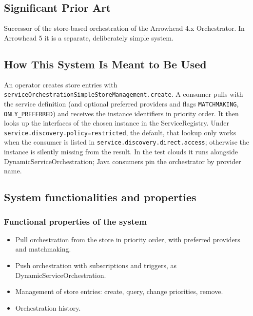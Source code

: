 \documentclass[a4paper]{arrowhead}
\begin{document}
\newpage

\subsection{Significant Prior Art}
\label{sec:prior_art}

Successor of the store-based orchestration of the Arrowhead 4.x Orchestrator. In Arrowhead 5 it is a separate, deliberately simple system.

\subsection{How This System Is Meant to Be Used}
\label{sec:use}

An operator creates store entries with \texttt{service\allowbreak{}Orchestration\allowbreak{}Simple\allowbreak{}Store\allowbreak{}Management.\allowbreak{}create}. A consumer pulls with the service definition (and optional preferred providers and flags \texttt{MATCHMAKING}, \texttt{ONLY\_\allowbreak{}PREFERRED}) and receives the instance identifiers in priority order. It then looks up the interfaces of the chosen instance in the ServiceRegistry. Under \texttt{service.\allowbreak{}discovery.\allowbreak{}policy=\allowbreak{}restricted}, the default, that lookup only works when the consumer is listed in \texttt{service.\allowbreak{}discovery.\allowbreak{}direct.\allowbreak{}access}; otherwise the instance is silently missing from the result. In the test clouds it runs alongside Dynamic\allowbreak{}Service\allowbreak{}Orchestration; Java consumers pin the orchestrator by provider name.

\subsection{System functionalities and properties}
\label{sec:properties}

\subsubsection{Functional properties of the system}

\begin{itemize}
  \item Pull orchestration from the store in priority order, with preferred providers and matchmaking.
  \item Push orchestration with subscriptions and triggers, as Dynamic\allowbreak{}Service\allowbreak{}Orchestration.
  \item Management of store entries: create, query, change priorities, remove.
  \item Orchestration history.
\end{itemize}
\end{document}
